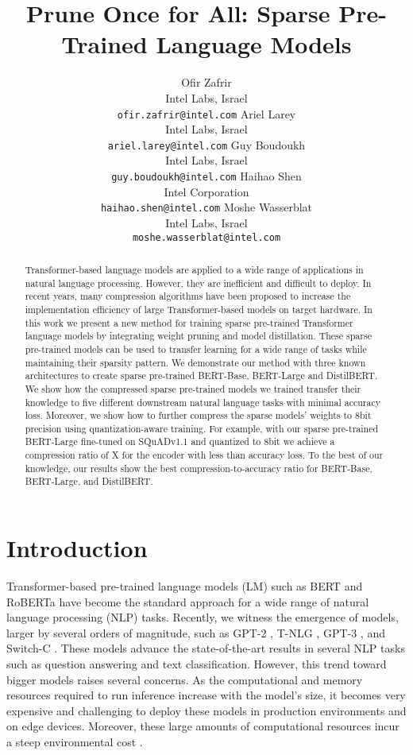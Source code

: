\documentclass{article}
\title{Prune Once for All: Sparse Pre-Trained Language Models}
\author{
  Ofir Zafrir \\
  Intel Labs, Israel \\
  \texttt{ofir.zafrir@intel.com}
  \And
  Ariel Larey \\
  Intel Labs, Israel \\
  \texttt{ariel.larey@intel.com}
  \And
  Guy Boudoukh \\
  Intel Labs, Israel \\
  \texttt{guy.boudoukh@intel.com}
  \And
  Haihao Shen \\
  Intel Corporation \\
  \texttt{haihao.shen@intel.com}
  \And
  Moshe Wasserblat \\
  Intel Labs, Israel \\
  \texttt{moshe.wasserblat@intel.com}
}
\begin{document}
\maketitle

\begin{abstract}
Transformer-based language models are applied to a wide range of applications in natural language processing.
However, they are inefficient and difficult to deploy.
In recent years, many compression algorithms have been proposed to increase the implementation efficiency of large Transformer-based models on target hardware.
In this work we present a new method for training sparse pre-trained Transformer language models by integrating weight pruning and model distillation.
These sparse pre-trained models can be used to transfer learning for a wide range of tasks while maintaining their sparsity pattern. 
We demonstrate our method with three known architectures to create sparse pre-trained BERT-Base, BERT-Large and DistilBERT.
We show how the compressed sparse pre-trained models we trained transfer their knowledge to five different downstream natural language tasks with minimal accuracy loss.
Moreover, we show how to further compress the sparse models' weights to 8bit precision using quantization-aware training.
For example, with our sparse pre-trained BERT-Large fine-tuned on SQuADv1.1 and quantized to 8bit we achieve a compression ratio of X for the encoder with less than  accuracy loss.
To the best of our knowledge, our results show the best compression-to-accuracy ratio for BERT-Base, BERT-Large, and DistilBERT.
\end{abstract}

\section{Introduction}
\label{sec:intro}
Transformer-based pre-trained language models (LM) such as BERT \citep{devlin2018bert} and RoBERTa \citep{liu2019roberta} have become the standard approach for a wide range of natural language processing (NLP) tasks.
Recently, we witness the emergence of models, larger by several orders of magnitude, such as GPT-2 \citep{radford2019gpt2}, T-NLG \citep{rosset2020tnlg}, GPT-3 \citep{brown2020gpt3}, and Switch-C \citep{fedus2021switch}. 
These models advance the state-of-the-art results in several NLP tasks such as question answering and text classification.
However, this trend toward bigger models raises several concerns.
As the computational and memory resources required to run inference increase with the model's size, it becomes very expensive and challenging to deploy these models in production environments and on edge devices.
Moreover, these large amounts of computational resources incur a steep environmental cost \citep{strubell2019green}.
\end{document}
